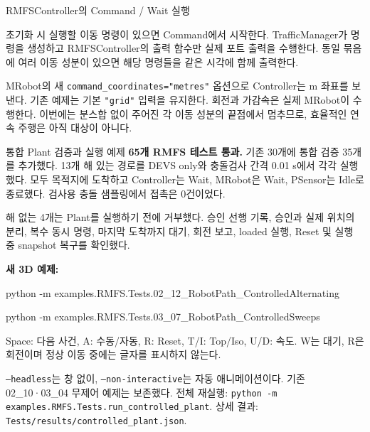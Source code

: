 \begin{frame}{RMFSController의 Command / Wait 실행}
\begin{center}\end{center}
\small 초기화 시 실행할 이동 명령이 있으면 Command에서 시작한다.
TrafficManager가 명령을 생성하고 RMFSController의 출력 함수만 실제 포트 출력을 수행한다.
동일 묶음에 여러 이동 성분이 있으면 해당 명령들을 같은 시각에 함께 출력한다.
\par\medskip
MRobot의 새 \texttt{command\_coordinates="metres"} 옵션으로 Controller는 m 좌표를 보낸다.
기존 예제는 기본 \texttt{"grid"} 입력을 유지한다.
회전과 가감속은 실제 MRobot이 수행한다. 이번에는 분스합 없이 주어진 각 이동 성분의
끝점에서 멈추므로, 효율적인 연속 주행은 아직 대상이 아니다.
\end{frame}

\begin{frame}{통합 Plant 검증과 실행 예제}
\small
\textbf{65개 RMFS 테스트 통과.} 기존 30개에 통합 검증 35개를 추가했다.
13개 해 있는 경로를 DEVS only와 충돌검사 간격 0.01 s에서 각각 실행했다.
모두 목적지에 도착하고 Controller는 Wait, MRobot은 Wait, PSensor는 Idle로 종료했다.
검사용 충돌 샘플링에서 접촉은 0건이었다.
\par\medskip
해 없는 4개는 Plant를 실행하기 전에 거부했다.
승인 선행 기록, 승인과 실제 위치의 분리, 복수 동시 명령, 마지막 도착까지 대기,
회전 보고, loaded 실행, Reset 및 실행 중 snapshot 복구를 확인했다.
\par\medskip
\textbf{새 3D 예제:}\par
{\scriptsize\ttfamily python -m examples.RMFS.Tests.02\_12\_RobotPath\_ControlledAlternating}\par
{\scriptsize\ttfamily python -m examples.RMFS.Tests.03\_07\_RobotPath\_ControlledSweeps}
\par\smallskip
Space: 다음 사건, A: 수동/자동, R: Reset, T/I: Top/Iso, U/D: 속도.
W는 대기, R은 회전이며 정상 이동 중에는 글자를 표시하지 않는다.
\par\smallskip\footnotesize
\texttt{--headless}는 창 없이, \texttt{--non-interactive}는 자동 애니메이션이다.
기존 02\_10·03\_04 무제어 예제는 보존했다.
전체 재실행: \texttt{python -m examples.RMFS.Tests.run\_controlled\_plant}.
상세 결과: \texttt{Tests/results/controlled\_plant.json}.
\end{frame}

